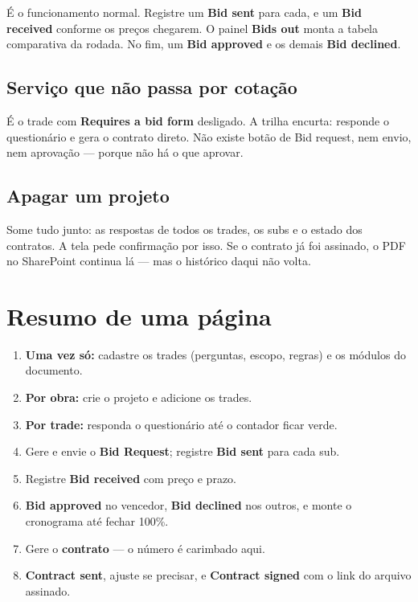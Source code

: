 \documentclass[11pt,a4paper]{article}
\newcommand{\ui}[1]{\textbf{\textsf{#1}}}
\begin{document}
É o funcionamento normal. Registre um \ui{Bid sent} para cada, e um
\ui{Bid received} conforme os preços chegarem. O painel \ui{Bids out} monta a
tabela comparativa da rodada. No fim, um \ui{Bid approved} e os demais
\ui{Bid declined}.

\subsection{Serviço que não passa por cotação}

É o trade com \ui{Requires a bid form} desligado. A trilha encurta: responde o
questionário e gera o contrato direto. Não existe botão de Bid request, nem
envio, nem aprovação — porque não há o que aprovar.

\subsection{Apagar um projeto}

Some tudo junto: as respostas de todos os trades, os subs e o estado dos
contratos. A tela pede confirmação por isso. Se o contrato já foi assinado, o PDF
no SharePoint continua lá — mas o histórico daqui não volta.

\section{Resumo de uma página}

\begin{enumerate}
  \item \textbf{Uma vez só:} cadastre os trades (perguntas, escopo, regras) e os
  módulos do documento.
  \item \textbf{Por obra:} crie o projeto e adicione os trades.
  \item \textbf{Por trade:} responda o questionário até o contador ficar verde.
  \item Gere e envie o \textbf{Bid Request}; registre \ui{Bid sent} para cada sub.
  \item Registre \ui{Bid received} com preço e prazo.
  \item \ui{Bid approved} no vencedor, \ui{Bid declined} nos outros, e monte o
  cronograma até fechar 100\%.
  \item Gere o \textbf{contrato} — o número é carimbado aqui.
  \item \ui{Contract sent}, ajuste se precisar, e \ui{Contract signed} com o link
  do arquivo assinado.
\end{enumerate}

\vfill
{}
\end{document}
